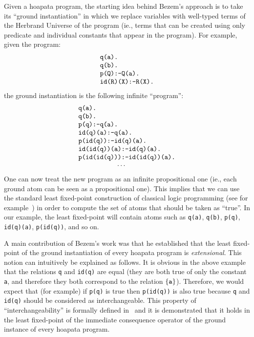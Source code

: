 \documentclass[submission,copyright]{eptcs}
\theoremstyle{definition}
\begin{document}
Given a hoapata program, the starting idea behind Bezem's approach is to take its
``ground instantiation'' in which we replace variables with well-typed terms of
the Herbrand Universe of the program (ie., terms that can be created using only
predicate and individual constants that appear in the program).  For example, given
the program:
\[
\begin{array}{l}
\mbox{\tt q(a).}\\
\mbox{\tt q(b).}\\
\mbox{\tt p(Q):-Q(a).}\\
\mbox{\tt id(R)(X):-R(X).}
\end{array}
\]
the ground instantiation is the following infinite ``program'':
\[
\begin{array}{l}
\mbox{\tt q(a).}\\
\mbox{\tt q(b).}\\
\mbox{\tt p(q):-q(a).}\\
\mbox{\tt id(q)(a):-q(a).}\\
\mbox{\tt p(id(q)):-id(q)(a).}\\
\mbox{\tt id(id(q))(a):-id(q)(a).}\\
\mbox{\tt p(id(id(q))):-id(id(q))(a).}\\
\hspace{2cm} \cdots
\end{array}
\]
One can now treat the new program as an infinite propositional one (ie., each ground atom can be seen
as a propositional one). This implies that we can use the standard least fixed-point construction
of classical logic programming (see for example~\cite{lloyd}) in order to compute the set of atoms
that should be taken as ``true''.  In our example, the least fixed-point will
contain atoms such as {\tt q(a)}, {\tt q(b)}, {\tt p(q)}, {\tt id(q)(a)}, {\tt p(id(q))},
and so on.

A main contribution of Bezem's work was that he established that the least fixed-point
of the ground instantiation of every hoapata program is {\em extensional}. This notion
can intuitively be explained as follows. It is obvious in the
above example that the relations {\tt q} and {\tt id(q)} are equal (they are both true of only the
constant {\tt a}, and therefore they both correspond to the relation $\{{\tt a}\}$).
Therefore, we would expect that (for example) if {\tt p(q)} is true then {\tt p(id(q))}
is also true because {\tt q} and {\tt id(q)} should be considered as interchangeable.
This property of ``interchangeability'' is formally defined in~\cite{Bezem99,Bezem01} and it is
demonstrated that it holds in the least fixed-point of the immediate consequence operator
of the ground instance of every hoapata program.
\end{document}
